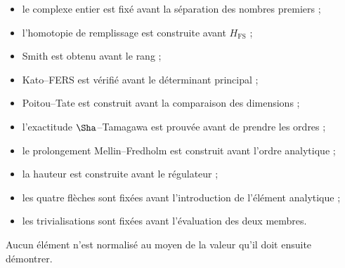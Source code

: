 \begin{itemize}
\item le complexe entier est fixé avant la séparation des nombres premiers ;
\item l’homotopie de remplissage est construite avant \(H_{\mathrm{FS}}\) ;
\item Smith est obtenu avant le rang ;
\item Kato–FERS est vérifié avant le déterminant principal ;
\item Poitou–Tate est construit avant la comparaison des dimensions ;
\item l’exactitude \(\Sha\)–Tamagawa est prouvée avant de prendre les ordres ;
\item le prolongement Mellin–Fredholm est construit avant l’ordre analytique ;
\item la hauteur est construite avant le régulateur ;
\item les quatre flèches sont fixées avant l’introduction de l’élément analytique ;
\item les trivialisations sont fixées avant l’évaluation des deux membres.
\end{itemize}
Aucun élément n’est normalisé au moyen de la valeur qu’il doit ensuite démontrer.\par
{}
